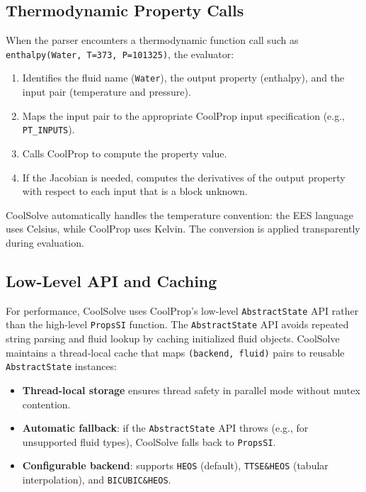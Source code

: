 \documentclass[review,3p]{elsarticle}
\begin{document}
\subsection{Thermodynamic Property Calls}

When the parser encounters a thermodynamic function call such as \texttt{enthalpy(Water, T=373, P=101325)}, the evaluator:
\begin{enumerate}
    \item Identifies the fluid name (\texttt{Water}), the output property (enthalpy), and the input pair (temperature and pressure).
    \item Maps the input pair to the appropriate CoolProp input specification (e.g., \texttt{PT\_INPUTS}).
    \item Calls CoolProp to compute the property value.
    \item If the Jacobian is needed, computes the derivatives of the output property with respect to each input that is a block unknown.
\end{enumerate}

CoolSolve automatically handles the temperature convention: the EES language uses Celsius, while CoolProp uses Kelvin. The conversion is applied transparently during evaluation.

\subsection{Low-Level API and Caching}

For performance, CoolSolve uses CoolProp's low-level \texttt{AbstractState} API rather than the high-level \texttt{PropsSI} function. The \texttt{AbstractState} API avoids repeated string parsing and fluid lookup by caching initialized fluid objects. CoolSolve maintains a thread-local cache that maps \texttt{(backend, fluid)} pairs to reusable \texttt{AbstractState} instances:

\begin{itemize}
    \item \textbf{Thread-local storage} ensures thread safety in parallel mode without mutex contention.
    \item \textbf{Automatic fallback}: if the \texttt{AbstractState} API throws (e.g., for unsupported fluid types), CoolSolve falls back to \texttt{PropsSI}.
    \item \textbf{Configurable backend}: supports \texttt{HEOS} (default), \texttt{TTSE\&HEOS} (tabular interpolation), and \texttt{BICUBIC\&HEOS}.
\end{itemize}
\end{document}
